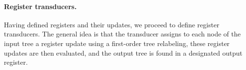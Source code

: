 
\paragraph*{Register transducers.} Having defined registers and their updates, we proceed to define register transducers. The general idea is that the transducer assigns to each node of the input tree a register update using a first-order tree relabeling, these register updates are then evaluated, and the output tree is found in a designated output register. 



